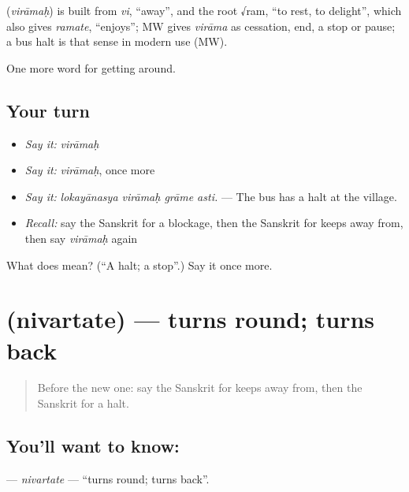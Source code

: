 \begin{cousinweb}
\textbf{} (\emph{virāmaḥ}) is built from \emph{vi}, \textquotedblleft{}away\textquotedblright{}, and the root √ram, \textquotedblleft{}to rest, to delight\textquotedblright{}, which also gives \emph{ramate}, \textquotedblleft{}enjoys\textquotedblright{}; MW gives \emph{virāma} as cessation, end, a stop or pause; a bus halt is that sense in modern use (MW).
\end{cousinweb}

\begin{grammarlens}[title={What you've built}]
One more word for getting around.
\end{grammarlens}

\subsection*{Your turn}
\begin{itemize}
\raggedright
  \item \emph{Say it:} \emph{virāmaḥ}
  \item \emph{Say it:} \emph{virāmaḥ}, once more
  \item \emph{Say it:} \emph{lokayānasya virāmaḥ grāme asti.} — The bus has a halt at the village.
  \item \emph{Recall:} say the Sanskrit for a blockage, then the Sanskrit for keeps away from, then say \emph{virāmaḥ} again
\end{itemize}

\begin{tcolorbox}[breakable,colback=teal!4,colframe=teal!35!black,title={Before you move on}]
What does  mean? (\textquotedblleft{}A halt; a stop\textquotedblright{}.) Say it once more.
\end{tcolorbox}
\section[\texorpdfstring{\sk{निवर्तते} (nivartate)}{निवर्तते (nivartate)}]{ (nivartate) — turns round; turns back}

\label{lesson:SA-C412-nivartate}



\begin{quote}
Before the new one: say the Sanskrit for keeps away from, then the Sanskrit for a halt.
\end{quote}

\subsection*{You'll want to know: }
\textbf{} — \emph{nivartate} — \textquotedblleft{}turns round; turns back\textquotedblright{}.

